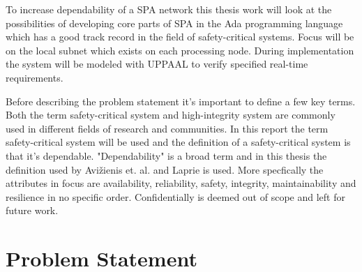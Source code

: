 
To increase dependability of a SPA network this thesis work will look at the
possibilities of developing core parts of SPA in the Ada programming language
which has a good track record in the field of safety-critical systems. Focus
will be on the local subnet which exists on each processing node.
During implementation the system will be modeled with UPPAAL to verify
specified real-time requirements.

Before describing the problem statement it's important to define a few key
terms. Both the term safety-critical system and high-integrity system are
commonly used in different fields of research and communities. In this report
the term safety-critical system will be used and the definition of a
safety-critical system is that it's dependable.  "Dependability" is a broad
term and in this thesis the definition used by Avi\v{z}ienis et. al.
\cite{avizienis2004} and Laprie \cite{laprie2008} is used. More specfically the
attributes in focus are availability, reliability, safety, integrity,
maintainability and resilience in no specific order.  Confidentially is deemed
out of scope and left for future work.

\section{Problem Statement}
% 
% 

